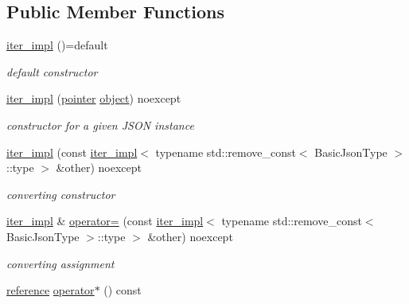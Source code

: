 \subsection*{Public Member Functions}
\begin{DoxyCompactItemize}
\item 
\mbox{\hyperlink{classnlohmann_1_1detail_1_1iter__impl_a19aa457f9c4af1b7e3af59839132cc5c}{iter\+\_\+impl}} ()=default
\begin{DoxyCompactList}\small\item\em default constructor \end{DoxyCompactList}\item 
\mbox{\hyperlink{classnlohmann_1_1detail_1_1iter__impl_a88a00484ac201c52fc5f613d88a2918b}{iter\+\_\+impl}} (\mbox{\hyperlink{classnlohmann_1_1detail_1_1iter__impl_a69e52f890ce8c556fd68ce109e24b360}{pointer}} \mbox{\hyperlink{namespacenlohmann_1_1detail_a1ed8fc6239da25abcaf681d30ace4985aa8cfde6331bd59eb2ac96f8911c4b666}{object}}) noexcept
\begin{DoxyCompactList}\small\item\em constructor for a given J\+S\+ON instance \end{DoxyCompactList}\item 
\mbox{\hyperlink{classnlohmann_1_1detail_1_1iter__impl_a867f7eb55091be31b013adb3e46816d3}{iter\+\_\+impl}} (const \mbox{\hyperlink{classnlohmann_1_1detail_1_1iter__impl}{iter\+\_\+impl}}$<$ typename std\+::remove\+\_\+const$<$ Basic\+Json\+Type $>$\+::type $>$ \&other) noexcept
\begin{DoxyCompactList}\small\item\em converting constructor \end{DoxyCompactList}\item 
\mbox{\hyperlink{classnlohmann_1_1detail_1_1iter__impl}{iter\+\_\+impl}} \& \mbox{\hyperlink{classnlohmann_1_1detail_1_1iter__impl_a7159ed1cfe7c423a2baef8bea0c94509}{operator=}} (const \mbox{\hyperlink{classnlohmann_1_1detail_1_1iter__impl}{iter\+\_\+impl}}$<$ typename std\+::remove\+\_\+const$<$ Basic\+Json\+Type $>$\+::type $>$ \&other) noexcept
\begin{DoxyCompactList}\small\item\em converting assignment \end{DoxyCompactList}\item 
\mbox{\hyperlink{classnlohmann_1_1detail_1_1iter__impl_a5be8001be099c6b82310f4d387b953ce}{reference}} \mbox{\hyperlink{classnlohmann_1_1detail_1_1iter__impl_a5ca57856d9bba54a5fc51cee891de827}{operator$\ast$}} () const

\end{DoxyCompactItemize}
